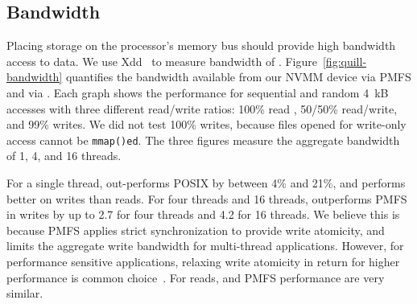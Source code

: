 
\subsection{Bandwidth}

Placing storage on the processor's memory bus should provide high
bandwidth access to data.  We use Xdd~\cite{xdd} to measure bandwidth of \DAChell{}.
Figure~\ref{fig:quill-bandwidth} quantifies the bandwidth available from our
NVMM device
via PMFS and via \DAChell{}.  Each graph shows the
performance for sequential and random 4~kB accesses with three different
read/write ratios: 100\% read , 50/50\% read/write, and 99\% writes.
We did not test 100\% writes, because files opened for write-only access cannot be \texttt{mmap()ed}. 
The three figures measure the aggregate bandwidth of 1, 4, and 16 threads. 

For a single thread, \DAChell{} out-performs POSIX by between 4\% and 21\%, and
\DAChell{} performs better on writes than reads.  For four threads and 16
threads, \DAChell{} outperforms PMFS in writes by up to 2.7\x{} for four
threads and 4.2\x{} for 16 threads.  We believe this is because PMFS applies
strict synchronization to provide write atomicity, and limits the aggregate
write bandwidth for multi-thread applications.  However, for performance
sensitive applications, relaxing write atomicity in return for higher
performance is common choice~\cite{slidesfromremzi}.  For
reads, \DAChell{} and PMFS performance are very similar.




